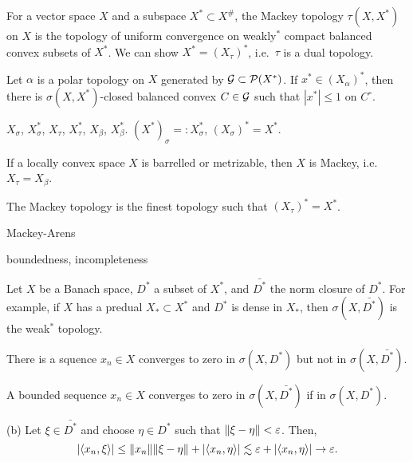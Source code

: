 \documentclass{../../large}
\begin{document}
\begin{prb}
For a vector space $X$ and a subspace $X^*\subset X^\#$, the Mackey topology $\tau(X,X^*)$ on $X$ is the topology of uniform convergence on weakly$^*$ compact balanced convex subsets of $X^*$.
We can show $X^*=(X_\tau)^*$, i.e.~$\tau$ is a dual topology.

Let $\alpha$ is a polar topology on $X$ generated by $\mathcal{G}\subset\mathcal{P}(X^*)$.
If $x^*\in(X_\alpha)^*$, then there is $\sigma(X,X^*)$-closed balanced convex $C\in\mathcal{G}$ such that $|x^*|\le1$ on $C^\circ$.

$X_\sigma$, $X^*_\sigma$, $X_\tau$, $X^*_\tau$, $X_\beta$, $X^*_\beta$.
$(X^*)_\sigma=:X^*_\sigma$, $(X_\sigma)^*=X^*$.

\begin{parts}
\item If a locally convex space $X$ is barrelled or metrizable, then $X$ is Mackey, i.e.~$X_\tau=X_\beta$.
\item The Mackey topology is the finest topology such that $(X_\tau)^*=X^*$.
\end{parts}
\end{prb}

Mackey-Arens

boundedness, incompleteness


\begin{prb}

\end{prb}

\begin{prb}
Let $X$ be a Banach space, $D^*$ a subset of $X^*$, and $\bar{D^*}$ the norm closure of $D^*$.
For example, if $X$ has a predual $X_*\subset X^*$ and $D^*$ is dense in $X_*$, then $\sigma(X,\bar{D^*})$ is the weak$^*$ topology.
\begin{parts}
\item There is a squence $x_n\in X$ converges to zero in $\sigma(X,D^*)$ but not in $\sigma(X,\bar{D^*})$.
\item A bounded sequence $x_n\in X$ converges to zero in $\sigma(X,\bar{D^*})$ if in $\sigma(X,D^*)$.
\end{parts}
\end{prb}
\begin{pf}
(b)
Let $\xi\in\bar{D^*}$ and choose $\eta\in D^*$ such that $\|\xi-\eta\|<\varepsilon$.
Then,
\[|\langle x_n,\xi\rangle|\le\|x_n\|\|\xi-\eta\|+|\langle x_n,\eta\rangle|\lesssim\varepsilon+|\langle x_n,\eta\rangle|\to\varepsilon.\]
\end{pf}
\end{document}
